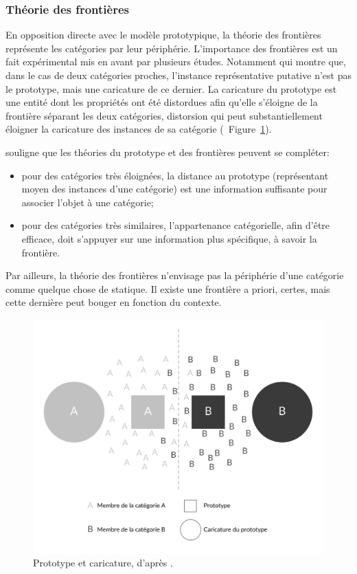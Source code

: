 \subsubsection{Théorie des frontières}

En opposition directe avec le modèle prototypique, la théorie des frontières représente les catégories par leur périphérie. L'importance des frontières est un fait expérimental mis en avant par plusieurs études. Notamment \citep{davis2010memory} qui montre que, dans le cas de deux catégories proches, l'instance représentative putative n'est pas le prototype, mais une caricature de ce dernier. La caricature du prototype est une entité dont les propriétés ont été distordues afin qu'elle s'éloigne de la frontière séparant les deux catégories, distorsion qui peut substantiellement éloigner la caricature des instances de sa catégorie (\cf~Figure~\ref{fig:prototypeCaricature}).

\citep{goldstone2003concepts} souligne que les théories du prototype et des frontières peuvent se compléter: 

\begin{itemize}
\item pour des catégories très éloignées, la distance au prototype (représentant moyen des instances d'une catégorie) est une information suffisante pour associer l'objet à une catégorie;
\item pour des catégories très similaires, l’appartenance catégorielle, afin d'être efficace, doit s'appuyer sur une information plus spécifique, à savoir la frontière.
\end{itemize}

Par ailleurs, la théorie des frontières n'envisage pas la périphérie d'une catégorie comme quelque chose de statique. Il existe une frontière a priori, certes, mais cette dernière peut bouger en fonction du contexte.

\begin{figure}[t]
        \myfloatalign
        \includegraphics[width=.8\linewidth]{gfx/ch_3/prototypeCaricature}
        \caption[Prototype et caricature.]{Prototype et caricature, d'après \citep{davis2010memory}.}\label{fig:prototypeCaricature}
\end{figure}

